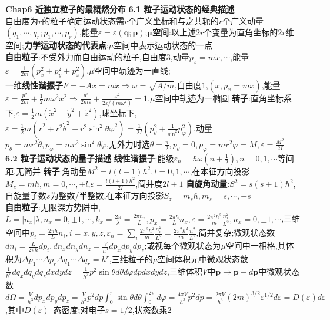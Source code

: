 \documentclass[10pt,a4paper]{article}
\begin{document}
\begin{multicols}{2}
\noindent\textbf{Chap6 近独立粒子的最概然分布}
\textbf{6.1 粒子运动状态的经典描述}\\
自由度为$r$的粒子确定运动状态需$r$个广义坐标和与之共轭的$r$个广义动量$(q_1,\cdots,q_r;p_1,\cdots,p_r)$,能量$\varepsilon=\varepsilon(\bm{q};\bm{p})$;$\bm{\mu}$\textbf{空间}:以上述$2r$个变量为直角坐标的$2r$维空间;\textbf{力学运动状态的代表点}:$\mu$空间中表示运动状态的一点\\
\textbf{自由粒子}:不受外力而自由运动的粒子,自由度$3$,动量$p_x=m\dot{x},\cdots$,能量$\varepsilon=\frac{1}{2m}(p_x^2+p_y^2+p_z^2)$,$\mu$空间中轨迹为一直线;\\
一维\textbf{线性谐振子}$F=-Ax=m\ddot{x}\Rightarrow\omega=\sqrt{A/m}$,自由度$1$,$(x,p_x=m\dot{x})$,能量$\varepsilon=\frac{p^2}{2m}+\frac{1}{2}m\omega^2x^2\Rightarrow\frac{p^2}{2m\varepsilon}+\frac{x^2}{2\varepsilon/(m\omega^2)}=1$,$\mu$空间中轨迹为一椭圆
\textbf{转子}:直角坐标系下,$\varepsilon=\frac{1}{2}m(\dot{x}^2+\dot{y}^2+\dot{z}^2)$,球坐标下,$\varepsilon=\frac{1}{2}m(\dot{r}^2+r^2\dot{\theta}^2+r^2\sin^2\theta\dot{\varphi}^2)=\frac{1}{2I}(p_{\theta}^2+\frac{1}{\sin^2}p_{\varphi}^2)$,动量$p_{\theta}=mr^2\dot{\theta},p_{\varphi}=mr^2\sin^2\theta\dot{\varphi}$,无外力时选$\theta=\frac{\pi}{2},p_{\theta}=0,p_{\varphi}=mr^2\dot{\varphi}=M,\varepsilon=\frac{M^2}{2I}$\\
\textbf{6.2 粒子运动状态的量子描述}
\textbf{线性谐振子}:能级$\varepsilon_n=\hbar\omega(n+\frac{1}{2}),n=0,1,\cdots$等间距,无简并
\textbf{转子}:角动量$M^2=l(l+1)\hbar^2,l=0,1,\cdots$,在本征方向投影$M_z=m\hbar,m=0,\cdots,\pm l$,$\varepsilon=\frac{l(l+1)\hbar^2}{2I}$,简并度$2l+1$
\textbf{自旋角动量}:$S^2=s(s+1)\hbar^2$,自旋量子数$s$为整数/半整数,在本征方向投影$S_z=m_s\hbar,m_s=s,\cdots,-s$\\
\textbf{自由粒子}:无限深方势阱中,$L=|n_x|\lambda,n_x=0,\pm1,\cdots,k_x=\frac{2\pi}{\lambda}=\frac{2\pi n_x}{L},p_x=\frac{2\pi\hbar}{L}n_x,\varepsilon=\frac{2\pi^2\hbar^2}{m}\frac{n_x^2}{L^2},n_x=0,\pm1,\cdots$,三维空间中$p_i=\frac{2\pi\hbar}{L}n_i,i=x,y,z,\varepsilon_n=\sum_i\frac{2\pi^2\hbar^2}{m}\frac{n_i^2}{L^2}=\frac{2\pi^2\hbar^2}{m}\frac{n^2}{L^2}$,简并复杂;微观状态数$dn_i=\frac{L}{2\pi\hbar}dp_i,dn_xdn_ydn_z=\frac{V}{h^3}dp_xdp_ydp_z$;或视每个微观状态为$\mu$空间中一相格,其体积为$\Delta p_1\cdots\Delta p_r\Delta q_1\cdots\Delta q_r=h^r$,三维粒子的$\mu$空间体积元中微观状态数$\frac{1}{h^r}dq_xdq_ydq_zdxdydz=\frac{1}{h^3}p^2\sin\theta d\theta d\varphi dpdxdydz$,三维体积$V$中$\bm{p}\rightarrow\bm{p}+d\bm{p}$中微观状态数$d\Omega=\frac{V}{h^3}dp_xdp_ydp_z=\frac{V}{h^3}p^2dp\int_0^{\pi}\sin\theta d\theta\int_0^{2\pi}d\varphi=\frac{4\pi V}{h^3}p^2dp=\frac{2\pi V}{h^3}(2m)^{3/2}\varepsilon^{1/2}d\varepsilon=D(\varepsilon)d\varepsilon$,其中$D(\varepsilon)$--态密度;对电子$s=1/2$,状态数乘$2$\\

\end{multicols}
\end{document}
